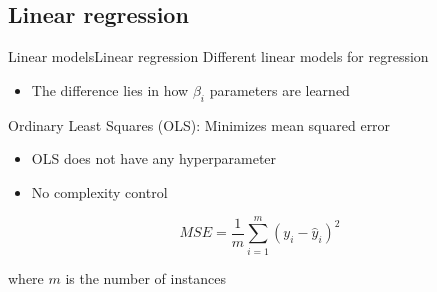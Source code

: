 \documentclass[10pt,compress]{beamer} %
\begin{document}
\subsection{Linear regression}
\begin{frame}{Linear models}{Linear regression}
    Different linear models for regression
    \begin{itemize}
        \item The difference lies in how $\beta_i$ parameters are learned
    \end{itemize}

	Ordinary Least Squares (OLS): Minimizes mean squared error
	\begin{itemize}
        \item OLS does not have any hyperparameter
        \item No complexity control
	\end{itemize}
    
    \begin{equation*}
    MSE = \frac{1}{m} \sum_{i=1}^m (y_i - \hat{y}_i)^2
    \end{equation*}

    where $m$ is the number of instances

\end{frame}
\end{document}
